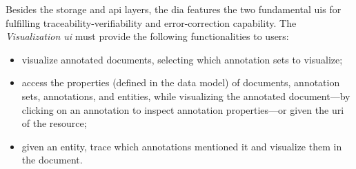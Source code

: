 Besides the storage and \ac{api} layers, the \ac{dia} features the two fundamental \acp{ui} for fulfilling traceability-verifiability and error-correction capability.
The \emph{Visualization \ac{ui}} must provide the following functionalities to users:
\begin{itemize}
  \item visualize annotated documents, selecting which annotation sets to visualize;
  \item access the properties (defined in the data model) of documents, annotation sets, annotations, and entities, while visualizing the annotated document---\eg by clicking on an annotation to inspect annotation properties---or given the \ac{uri} of the resource;
  \item given an entity, trace which annotations mentioned it and visualize them in the document.
\end{itemize}

